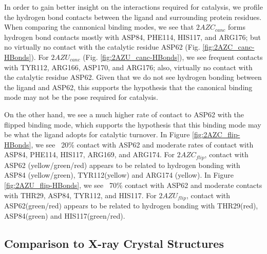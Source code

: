 In order to gain better insight on the interactions required for catalysis, we profile the hydrogen bond contacts between the ligand and surrounding protein residues.
When comparing the cannonical binding modes, we see that $2AZC_{canc}$ forms hydrogen bond contacts mostly with ASP84, PHE114, HIS117, and ARG176; but no virtually no contact with the catalytic residue ASP62 (Fig. \ref{fig:2AZC_canc-HBonds}).
For $2AZU_{canc}$ (Fig. \ref{fig:2AZU_canc-HBonds}), we see frequent contacts with TYR112, ARG166, ASP170, and ARG176; also, virtually no contact with the catalytic residue ASP62.
Given that we do not see hydrogen bonding between the ligand and ASP62, this supports the hypothesis that the canonical binding mode may not be the pose required for catalysis.

On the other hand, we see a much higher rate of contact to ASP62 with the flipped binding mode, which supports the hypothesis that this binding mode may be what the ligand adopts for catalytic turnover.
In Figure \ref{fig:2AZC_flip-HBonds}, we see ~20\% contact with ASP62 and moderate rates of contact with ASP84, PHE114, HIS117, ARG169, and ARG174.
For $2AZC_{flip}$, contact with ASP62 (yellow/green/red) appears to be related to hydrogen bonding with ASP84 (yellow/green), TYR112(yellow) and ARG174 (yellow).
In Figure \ref{fig:2AZU_flip-HBonds}, we see ~70\% contact with ASP62 and moderate contacts with THR29, ASP84, TYR112, and HIS117.
For $2AZU_{flip}$, contact with ASP62(green/red) appears to be related to hydrogen bonding with THR29(red), ASP84(green) and HIS117(green/red).

\subsection{Comparison to X-ray Crystal Structures}

